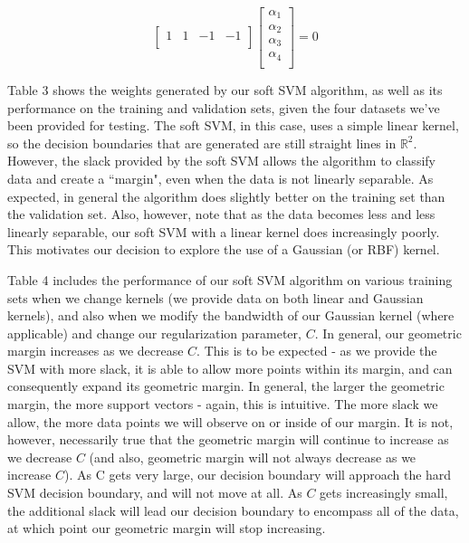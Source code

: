 \documentclass[10pt]{article}
\begin{document}
\[
\begin{bmatrix}
    1 & 1 & -1 & -1 \\
\end{bmatrix}
\begin{bmatrix}
    \alpha_1 \\
    \alpha_2 \\
    \alpha_3 \\
    \alpha_4 \\
\end{bmatrix} 
= 0
\]

Table 3 shows the weights generated by our soft SVM algorithm, as well as its performance on the training and validation sets, given the four datasets we've been provided for testing. The soft SVM, in this case, uses a simple linear kernel, so the decision boundaries that are generated are still straight lines in $\mathbb{R}^2$. However, the slack provided by the soft SVM allows the algorithm to classify data and create a ``margin", even when the data is not linearly separable. As expected, in general the algorithm does slightly better on the training set than the validation set. Also, however, note that as the data becomes less and less linearly separable, our soft SVM with a linear kernel does increasingly poorly. This motivates our decision to explore the use of a Gaussian (or RBF) kernel.

Table 4 includes the performance of our soft SVM algorithm on various training sets when we change kernels (we provide data on both linear and Gaussian kernels), and also when we modify the bandwidth of our Gaussian kernel (where applicable) and change our regularization parameter, $C$. In general, our geometric margin increases as we decrease $C$. This is to be expected - as we provide the SVM with more slack, it is able to allow more points within its margin, and can consequently expand its geometric margin. In general, the larger the geometric margin, the more support vectors - again, this is intuitive. The more slack we allow, the more data points we will observe on or inside of our margin. It is not, however, necessarily true that the geometric margin will continue to increase as we decrease $C$ (and also, geometric margin will not always decrease as we increase $C$). As C gets very large, our decision boundary will approach the hard SVM decision boundary, and will not move at all. As $C$ gets increasingly small, the additional slack will lead our decision boundary to encompass all of the data, at which point our geometric margin will stop increasing.
\end{document}
